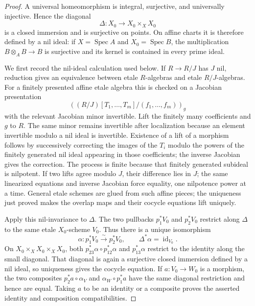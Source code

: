 \begin{proof}
\uses{} 
A universal homeomorphism is integral, surjective, and universally
injective.  Hence the diagonal
\[
 \Delta:X_0\longrightarrow X_0\times_XX_0
\]
is a closed immersion and is surjective on points.  On affine charts it is
therefore defined by a nil ideal: if
$X=\operatorname{Spec}A$ and $X_0=\operatorname{Spec}B$, the multiplication
$B\otimes_AB\to B$ is surjective and its kernel is contained in every prime
ideal.

We first record the nil-ideal calculation used below.  If $R\to R/J$ has
$J$ nil, reduction gives an equivalence between etale $R$-algebras and
etale $R/J$-algebras.  For a finitely presented affine etale algebra this is
checked on a Jacobian presentation
\[
 ((R/J)[T_1,\ldots,T_m]/(f_1,\ldots,f_m))_g
\]
with the relevant Jacobian minor invertible.  Lift the finitely many
coefficients and $g$ to $R$.  The same minor remains invertible after
localization because an element invertible modulo a nil ideal is invertible.
Existence of a lift of a morphism follows by successively correcting the
images of the $T_i$ modulo the powers of the finitely generated nil ideal
appearing in those coefficients; the inverse Jacobian gives the correction.
The process is finite because that finitely generated subideal is nilpotent.
If two lifts agree modulo $J$, their difference lies in $J$; the same
linearized equations and inverse Jacobian force equality, one nilpotence
power at a time.  General etale schemes are glued from such affine pieces;
the uniqueness just proved makes the overlap maps and their cocycle
equations lift uniquely.

Apply this nil-invariance to $\Delta$.  The two pullbacks
$p_1^*V_0$ and $p_2^*V_0$ restrict along $\Delta$ to the same etale
$X_0$-scheme $V_0$.  Thus there is a unique isomorphism
\[
 \alpha:p_1^*V_0\xrightarrow{\sim}p_2^*V_0,\qquad
 \Delta^*\alpha=\operatorname{id}_{V_0}.
\]
On $X_0\times_XX_0\times_XX_0$, both
$p_{23}^*\alpha\circ p_{12}^*\alpha$ and $p_{13}^*\alpha$ restrict to the
identity along the small diagonal.  That diagonal is again a surjective
closed immersion defined by a nil ideal, so uniqueness gives the cocycle
equation.  If $a:V_0\to W_0$ is a morphism, the two composites
$p_2^*a\circ\alpha_V$ and $\alpha_W\circ p_1^*a$ have the same diagonal
restriction and hence are equal.  Taking $a$ to be an identity or a
composite proves the asserted identity and composition compatibilities.
\end{proof}

